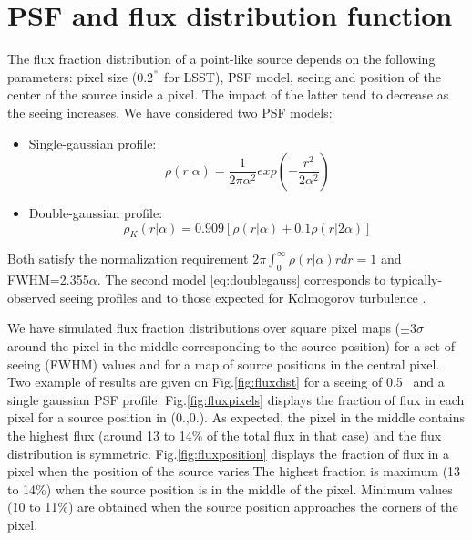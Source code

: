 \documentclass[\docopts]{\docclass}
\begin{document}

\section{PSF and flux distribution function}
\label{sec:psfflux}
The flux fraction distribution of a point-like source depends on the following  parameters: pixel size (0.2$^{"}$ for LSST), PSF model, seeing and position of the center of the source inside a pixel. The impact of the latter tend to decrease as the seeing increases. We have considered two PSF models:
\begin{itemize}
\item Single-gaussian profile:
  \begin{equation}
    \rho(r|\alpha)={\frac{1}{2\pi\alpha^2}}exp\left(-{\frac{r^2}{2\alpha^2}}\right) \label{eq:singlegauss}
   \end{equation}
\item Double-gaussian profile:
\begin{equation}
  \rho_K(r|\alpha)= 0.909 \left[\rho(r|\alpha)+0.1\rho(r|2\alpha)\right] \label{eq:doublegauss}
  \end{equation}
 \end{itemize}
Both satisfy the normalization requirement $ 2\pi \int^{\infty}_{0} \rho(r|\alpha) r dr = 1$ and FWHM=2.355$\alpha$. The second model \eqref{eq:doublegauss} corresponds to typically-observed seeing profiles and to those expected for Kolmogorov turbulence \cite{LSE40}. \par
We have simulated flux fraction distributions over square pixel maps ($\pm 3 \sigma$ around the pixel in the middle corresponding to the source position) for a set of seeing (FWHM) values and for a map of source positions in the central pixel.  Two example of results are given on Fig.\ref{fig:fluxdist} for a seeing of 0.5\arcsec~ and a single gaussian PSF profile. Fig.\ref{fig:fluxpixels} displays the fraction of flux in each pixel for a source position in (0.,0.). As expected, the pixel in the middle contains the highest flux (around 13 to 14\% of the total flux in that case) and the flux distribution is symmetric.  Fig.\ref{fig:fluxposition} displays the fraction of flux in a pixel when the position of the source varies.The highest fraction is maximum (13 to 14\%) when the source position is in the middle of the pixel. Minimum values (\~10 to 11\%) are obtained when the source position approaches the corners of the pixel.
\end{document}
